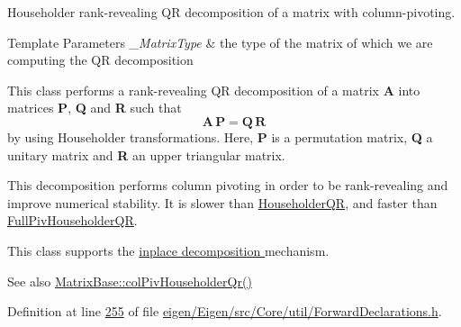 Householder rank-\/revealing QR decomposition of a matrix with column-\/pivoting. 


\begin{DoxyTemplParams}{Template Parameters}
{\em \+\_\+\+Matrix\+Type} & the type of the matrix of which we are computing the QR decomposition\\
\hline
\end{DoxyTemplParams}
This class performs a rank-\/revealing QR decomposition of a matrix {\bfseries A} into matrices {\bfseries P}, {\bfseries Q} and {\bfseries R} such that \[ \mathbf{A} \, \mathbf{P} = \mathbf{Q} \, \mathbf{R} \] by using Householder transformations. Here, {\bfseries P} is a permutation matrix, {\bfseries Q} a unitary matrix and {\bfseries R} an upper triangular matrix.

This decomposition performs column pivoting in order to be rank-\/revealing and improve numerical stability. It is slower than \hyperlink{group___q_r___module_class_eigen_1_1_householder_q_r}{Householder\+QR}, and faster than \hyperlink{group___q_r___module_class_eigen_1_1_full_piv_householder_q_r}{Full\+Piv\+Householder\+QR}.

This class supports the \hyperlink{group___inplace_decomposition}{inplace decomposition } mechanism.

\begin{DoxySeeAlso}{See also}
\hyperlink{group___core___module_adee8c19c833245bbb00a591dce68e8a4}{Matrix\+Base\+::col\+Piv\+Householder\+Qr()} 
\end{DoxySeeAlso}


Definition at line \hyperlink{eigen_2_eigen_2src_2_core_2util_2_forward_declarations_8h_source_l00255}{255} of file \hyperlink{eigen_2_eigen_2src_2_core_2util_2_forward_declarations_8h_source}{eigen/\+Eigen/src/\+Core/util/\+Forward\+Declarations.\+h}.


